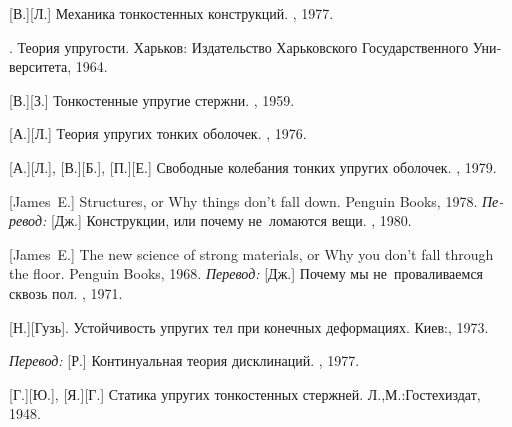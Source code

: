 \begin{thebibliography}{123}
\begin{otherlanguage}{russian}
[В.][Л.]
Механика тонкостенных конструкций.
\maschinenbaumoskauerverlag,
1977.

.
Теория упругости.
Харьков:
Издательство Харьковского Государственного Университета,
1964.

[В.][З.]
Тонкостенные упругие стержни.
\fizmatgiz, 1959.

[А.][Л.]
Теория упругих тонких оболочек.
\naukapublisher,
1976.

[А.][Л.],
[В.][Б.],
[П.][Е.]
Свободные ко\-леба\-ния тонких упругих оболочек.
\naukapublisher,
1979.

[James~E.]
Structures, or Why things don’t fall down.
Penguin Books,
1978.
\emph{Перевод:}
[Дж.]
Конструкции, или почему не~ломаются вещи.
\mirpublisher,
1980.

[James~E.]
The new science of strong materials, or Why you don’t fall through the floor.
Penguin Books,
1968.
\emph{Перевод:}
[Дж.]
Почему мы не~проваливаемся сквозь пол.
\mirpublisher,
1971.

[Н.][Гузь].
Устойчивость упругих тел при конечных деформациях.
Киев:\;, 1973.


\emph{Перевод:}
[Р.]
Континуальная теория дисклинаций.
\mirpublisher,
1977.

[Г.][Ю.],
[Я.][Г.]
Статика упругих тонкостенных стержней.
Л.,\:М.:\;Гостехиздат, 1948.


\end{otherlanguage}
\end{thebibliography}
